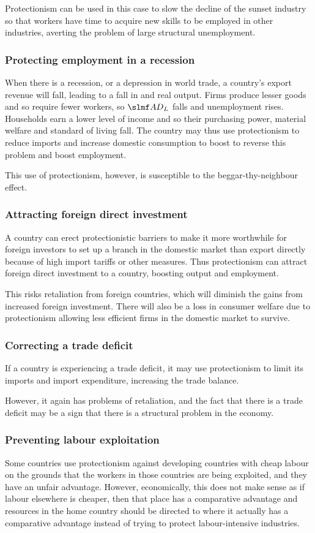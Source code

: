 \documentclass[Economics.tex]{subfiles}
\begin{document}
Protectionism can be used in this case to slow the decline of the sunset industry so that workers have time to acquire new skills to be employed in other industries, averting the problem of large structural unemployment.
\subsubsection{Protecting employment in a recession}
When there is a recession, or a depression in world trade, a country's export revenue will fall, leading to a fall in \AD{} and real output. Firms produce lesser goods and so require fewer workers, so \(\AD_L\) falls and unemployment rises. Households earn a lower level of income and so their purchasing power, material welfare and standard of living fall. The country may thus use protectionism to reduce imports and increase domestic consumption to boost \AD{} to reverse this problem and boost employment.

This use of protectionism, however, is susceptible to the beggar-thy-neighbour effect.
\subsubsection{Attracting foreign direct investment}
A country can erect protectionistic barriers to make it more worthwhile for foreign investors to set up a branch in the domestic market than export directly because of high import tariffs or other measures. Thus protectionism can attract foreign direct investment to a country, boosting output and employment.

This risks retaliation from foreign countries, which will diminish the gains from increased foreign investment. There will also be a loss in consumer welfare due to protectionism allowing less efficient firms in the domestic market to survive.
\subsubsection{Correcting a trade deficit}
If a country is experiencing a trade deficit, it may use protectionism to limit its imports and import expenditure, increasing the trade balance.

However, it again has problems of retaliation, and the fact that there is a trade deficit may be a sign that there is a structural problem in the economy.
\subsubsection{Preventing labour exploitation}
Some countries use protectionism against developing countries with cheap labour on the grounds that the workers in those countries are being exploited, and they have an unfair advantage. However, economically, this does not make sense as if labour elsewhere is cheaper, then that place has a comparative advantage and resources in the home country should be directed to where it actually has a comparative advantage instead of trying to protect labour-intensive industries.
\end{document}
